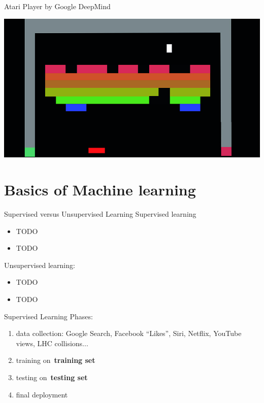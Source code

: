 \documentclass{beamer}
\newcommand{\todo}{\alert{TODO}}
\begin{document}
  {
    \begin{frame}{Atari Player by Google DeepMind}
      \begin{center}
        \includegraphics[width=\textwidth, height=\textheight, keepaspectratio]{../img/atari_breakout.jpg}
      \end{center}
    \end{frame}
  }


  \section{Basics of Machine learning}

  \begin{frame}{Supervised versus Unsupervised Learning}
    Supervised learning
    \begin{itemize}[<+- | alert@+>]
      \item \todo
      \item \todo
    \end{itemize}
    \pause

    Unsupervised learning:
    \begin{itemize}[<+- | alert@+>]
      \item \todo
      \item \todo
    \end{itemize}
  \end{frame}

  \begin{frame}{Supervised Learning}
    Phases:
    \pause
    \begin{enumerate}[<+- | alert@+>]
      \item data collection: Google Search, Facebook ``Likes'', Siri, Netflix, YouTube views, LHC collisions...
      \item training on~\textbf{training set}
      \item testing on~\textbf{testing set}
      \item final deployment
    \end{enumerate}
    \pause
  \end{frame}
\end{document}
